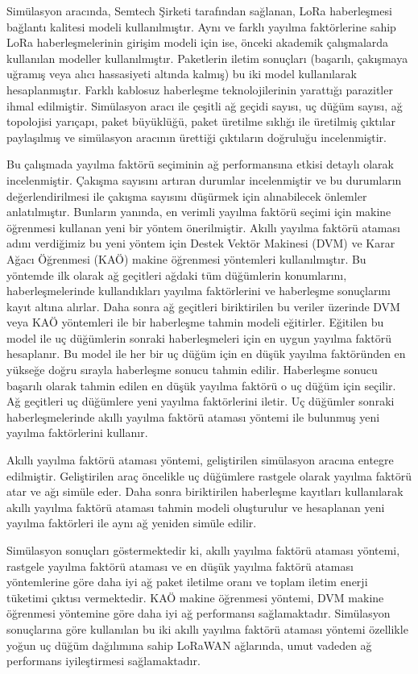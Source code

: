 Simülasyon aracında, Semtech Şirketi tarafından sağlanan, LoRa haberleşmesi bağlantı kalitesi modeli kullanılmıştır. Aynı ve farklı yayılma faktörlerine sahip LoRa haberleşmelerinin girişim modeli için ise, önceki akademik çalışmalarda kullanılan modeller kullanılmıştır. Paketlerin iletim sonuçları (başarılı, çakışmaya uğramış veya alıcı hassasiyeti altında kalmış) bu iki model kullanılarak hesaplanmıştır. Farklı kablosuz haberleşme teknolojilerinin yarattığı parazitler ihmal edilmiştir. Simülasyon aracı ile çeşitli ağ geçidi sayısı, uç düğüm sayısı, ağ topolojisi yarıçapı, paket büyüklüğü, paket üretilme sıklığı ile üretilmiş çıktılar paylaşılmış ve simülasyon aracının ürettiği çıktıların doğruluğu incelenmiştir.

Bu çalışmada yayılma faktörü seçiminin ağ performansına etkisi detaylı olarak incelenmiştir. Çakışma sayısını artıran durumlar incelenmiştir ve bu durumların değerlendirilmesi ile çakışma sayısını düşürmek için alınabilecek önlemler anlatılmıştır. Bunların yanında, en verimli yayılma faktörü seçimi için makine öğrenmesi kullanan yeni bir yöntem önerilmiştir. Akıllı yayılma faktörü ataması adını verdiğimiz bu yeni yöntem için Destek Vektör Makinesi (DVM) ve Karar Ağacı Öğrenmesi (KAÖ) makine öğrenmesi yöntemleri kullanılmıştır. Bu yöntemde ilk olarak ağ geçitleri ağdaki tüm düğümlerin konumlarını, haberleşmelerinde kullandıkları yayılma faktörlerini ve haberleşme sonuçlarını kayıt altına alırlar. Daha sonra ağ geçitleri biriktirilen bu veriler üzerinde DVM veya KAÖ yöntemleri ile bir haberleşme tahmin modeli eğitirler. Eğitilen bu model ile uç düğümlerin sonraki haberleşmeleri için en uygun yayılma faktörü hesaplanır. Bu model ile her bir uç düğüm için en düşük yayılma faktöründen en yükseğe doğru sırayla haberleşme sonucu tahmin edilir. Haberleşme sonucu başarılı olarak tahmin edilen en düşük yayılma faktörü o uç düğüm için seçilir. Ağ geçitleri uç düğümlere yeni yayılma faktörlerini iletir. Uç düğümler sonraki haberleşmelerinde akıllı yayılma faktörü ataması yöntemi ile bulunmuş yeni yayılma faktörlerini kullanır.

Akıllı yayılma faktörü ataması yöntemi, geliştirilen simülasyon aracına entegre edilmiştir. Geliştirilen araç öncelikle uç düğümlere rastgele olarak yayılma faktörü atar ve ağı simüle eder. Daha sonra biriktirilen haberleşme kayıtları kullanılarak akıllı yayılma faktörü ataması tahmin modeli oluşturulur ve hesaplanan yeni yayılma faktörleri ile aynı ağ yeniden simüle edilir.

Simülasyon sonuçları göstermektedir ki, akıllı yayılma faktörü ataması yöntemi, rastgele yayılma faktörü ataması ve en düşük yayılma faktörü ataması yöntemlerine göre daha iyi ağ paket iletilme oranı ve toplam iletim enerji tüketimi çıktısı vermektedir. KAÖ makine öğrenmesi yöntemi, DVM makine öğrenmesi yöntemine göre daha iyi ağ performansı sağlamaktadır. Simülasyon sonuçlarına göre kullanılan bu iki akıllı yayılma faktörü ataması yöntemi özellikle yoğun uç düğüm dağılımına sahip LoRaWAN ağlarında, umut vadeden ağ performans iyileştirmesi sağlamaktadır.
